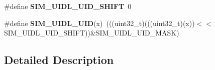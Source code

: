 \begin{DoxyCompactItemize}
\item 
\#define {\bfseries S\+I\+M\+\_\+\+U\+I\+D\+L\+\_\+\+U\+I\+D\+\_\+\+S\+H\+I\+FT}~0\hypertarget{group__SIM__Register__Masks_ga6fb1383717ebfa6f47b5a5952fd21d63}{}\label{group__SIM__Register__Masks_ga6fb1383717ebfa6f47b5a5952fd21d63}

\item 
\#define {\bfseries S\+I\+M\+\_\+\+U\+I\+D\+L\+\_\+\+U\+ID}(x)~(((uint32\+\_\+t)(((uint32\+\_\+t)(x))$<$$<$S\+I\+M\+\_\+\+U\+I\+D\+L\+\_\+\+U\+I\+D\+\_\+\+S\+H\+I\+FT))\&S\+I\+M\+\_\+\+U\+I\+D\+L\+\_\+\+U\+I\+D\+\_\+\+M\+A\+SK)\hypertarget{group__SIM__Register__Masks_ga636c37811a4a8c9a57df79fd1790b800}{}\label{group__SIM__Register__Masks_ga636c37811a4a8c9a57df79fd1790b800}

\end{DoxyCompactItemize}


\subsection{Detailed Description}
